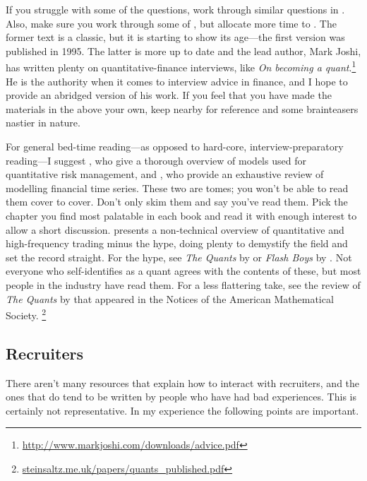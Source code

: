 \documentclass[a4paper]{article}
\begin{document}
If you struggle with some of the questions, work through similar questions in \citep{JoshiQA}.
Also, make sure you work through some of \citet{HeardOnTheStreet}, but allocate more time to \citet{JoshiQA}.
The former text is a classic, but it is starting to show its age---the first version was published in 1995.
The latter is more up to date and the lead author, Mark Joshi, has written plenty on quantitative-finance interviews, like
\emph{On becoming a quant}.\footnote{\url{http://www.markjoshi.com/downloads/advice.pdf}}
He is the authority when it comes to interview advice in finance, and I hope to provide an abridged version of his work.
If you feel that you have made the materials in the above your own, keep \citet{WilmottFAQ} nearby for reference and some brainteasers nastier in nature.

For general bed-time reading---as opposed to hard-core, interview-preparatory reading---I suggest
\citet{mcneil2015quantitative}, who give a thorough overview of models used for quantitative risk management, and
\citet{andersen2009handbook}, who provide an exhaustive review of modelling financial time series.
These two are tomes; you won't be able to read them cover to cover.
Don't only skim them and say you've read them.
Pick the chapter you find most palatable in each book and read it with enough interest to allow a short discussion.
\citet{narang2013inside} presents a non-technical overview of quantitative and high-frequency trading minus the hype, doing plenty to demystify the field and set the record straight.
For the hype, see
\emph{The Quants} by \citet{patterson2010quants}
or
\emph{Flash Boys} by \citet{lewis2014flash}.
Not everyone who self-identifies as a quant agrees with the contents of these, but most people in the industry have read them.
For a less flattering take, see the review of \emph{The Quants} by \citet{steinsaltz2011value} that appeared in the Notices of the American Mathematical Society.%
\footnote{\url{steinsaltz.me.uk/papers/quants_published.pdf}}

{}
\subsection*{Recruiters}
There aren't many resources that explain how to interact with recruiters, and the ones that do tend to be written by people who have had bad experiences.
This is certainly not representative. In my experience the following points are important.
\end{document}
